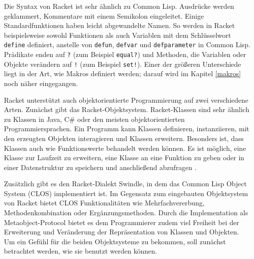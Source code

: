 Die Syntax von Racket ist sehr ähnlich zu Common Lisp. Ausdrücke werden geklammert, Kommentare mit einem Semikolon eingeleitet. Einige Standardfunktionen haben leicht abgewandelte Namen. So werden in Racket beispielsweise sowohl Funktionen als auch Variablen mit dem Schlüsselwort \texttt{define} definiert, anstelle von \texttt{defun}, \texttt{defvar} und \texttt{defparameter} in Common Lisp. Prädikate enden auf \texttt{?} (zum Beispiel \texttt{equal?}) und Methoden, die Variablen oder Objekte verändern auf \texttt{!} (zum Beispiel \texttt{set!}). Einer der größeren Unterschiede liegt in der Art, wie Makros definiert werden; darauf wird im Kapitel \ref{makros} noch näher eingegangen.

Racket unterstützt auch objektorientierte Programmierung auf zwei verschiedene Arten. Zunächst gibt das Racket-Objektsystem. Racket-Klassen sind sehr ähnlich zu Klassen in Java, C\# oder den meisten objektorientierten Programmiersprachen. Ein Programm kann Klassen definieren, instanziieren, mit den erzeugten Objekten interagieren und Klassen erweitern. Besonders ist, dass Klassen auch wie Funktionswerte behandelt werden können. Es ist möglich, eine Klasse zur Laufzeit zu erweitern, eine Klasse an eine Funktion zu geben oder in einer Datenstruktur zu speichern und anschließend abzufragen \cite{neu-edu}. 

Zusätzlich gibt es den Racket-Dialekt Swindle, in dem das Common Lisp Object System (CLOS) implementiert ist. Im Gegensatz zum eingebauten Objektsystem von Racket bietet CLOS Funktionalitäten wie Mehrfachvererbung, Methodenkombination oder Ergänzungsmethoden. Durch die Implementation als Metaobject-Protocol bietet es dem Programmierer zudem viel Freiheit bei der Erweiterung und Veränderung der Repräsentation von Klassen und Objekten.
Um ein Gefühl für die beiden Objektsysteme zu bekommen, soll zunächst betrachtet werden, wie sie benutzt werden können. %


